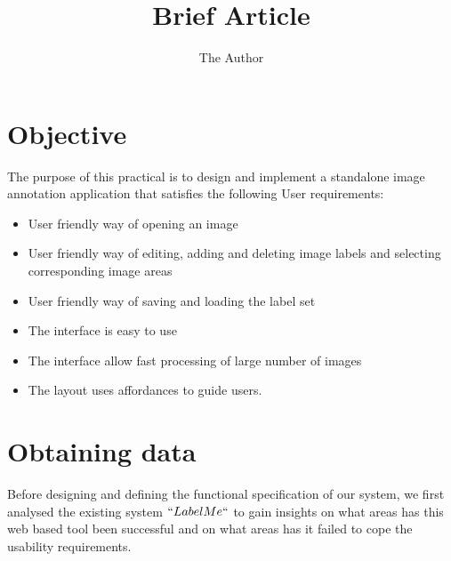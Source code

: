 \documentclass[11pt]{amsart}
\title{Brief Article}
\author{The Author}
\begin{document}
\maketitle
\setlength{\parindent}{1cm}
\section {Objective}
The purpose of this practical is to design and implement a standalone image annotation application that satisfies the following User requirements:

\begin{itemize}
\item  User friendly way of opening an image
\item  User friendly way of editing, adding and deleting image labels and selecting corresponding image
areas
\item  User friendly way of saving and loading the label set
\item The interface is easy to use
\item The interface allow fast processing of large number of images
\item The layout uses affordances to guide users.
\end{itemize}



  
\section {Obtaining data}
 Before designing and  defining the functional specification of our system, we first  analysed the existing system \(``Label Me ``\) to gain insights on what areas has this web based tool  been successful and on what areas has it failed to cope the usability requirements.
\end{document}
